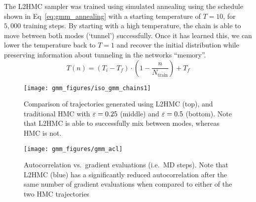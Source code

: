 %
The L2HMC sampler was trained using simulated annealing using the schedule
shown in Eq~\ref{eq:gmm_annealing} with a starting temperature of $T = 10$, for
$5,000$ training steps.
%
By starting with a high temperature, the chain is able to move between both
modes (`tunnel') successfully.
%
Once it has learned this, we can lower the temperature back to $T = 1$ and
recover the initial distribution while preserving information about tunneling
in the networks ``memory''.
%
\begin{equation}
  T(n) = {\left(T_{i} - T_{f}\right)} \cdot {\left(1 -
  \frac{n}{N_{\mathrm{train}}}\right)} + T_{f} 
\label{eq:gmm_annealing}
\end{equation}
%
\begin{figure}[htbp]
    \centering
    \texttt{[image: gmm\_figures/iso\_gmm\_chains1]}
    \caption{Comparison of trajectories generated using L2HMC (top), and
        traditional HMC with ${\varepsilon} = 0.25$ (middle) and ${\varepsilon} = 0.5$ (bottom).
        Note that L2HMC is able to successfully mix between modes, whereas HMC
        is not.}%
\label{fig:gmm_trajectories}
\end{figure}
%
\begin{figure}[htbp]
    \centering
    \texttt{[image: gmm\_figures/gmm\_acl]}
    \caption{Autocorrelation vs.\ gradient evaluations (i.e.\ MD steps). Note
    that L2HMC (blue) has a significantly reduced autocorrelation after the
  same number of gradient evaluations when compared to either of the two HMC
trajectories}%
\label{fig:gmm_autocorrelation} 
\end{figure}
%
